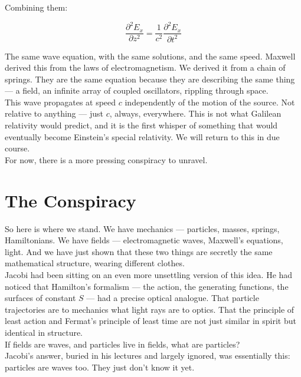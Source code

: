 \documentclass[krantz1,ChapterTOCs]{krantz}
\begin{document}
Combining them:

$$\frac{\partial^2 E_x}{\partial z^2} = \frac{1}{c^2}\frac{\partial^2 E_x}{\partial t^2}$$

The same wave equation, with the same solutions, and the same speed. Maxwell derived this from the laws of electromagnetism. We derived it from a chain of springs. They are the same equation because they are describing the same thing --- a field, an infinite array of coupled oscillators, rippling through space.\\

This wave propagates at speed $c$ independently of the motion of the source. Not relative to anything --- just $c$, always, everywhere. This is not what Galilean relativity would predict, and it is the first whisper of something that would eventually become Einstein's special relativity. We will return to this in due course.\\

For now, there is a more pressing conspiracy to unravel.\\

\section*{The Conspiracy}

So here is where we stand. We have mechanics --- particles, masses, springs, Hamiltonians. We have fields --- electromagnetic waves, Maxwell's equations, light. And we have just shown that these two things are secretly the same mathematical structure, wearing different clothes.\\

Jacobi had been sitting on an even more unsettling version of this idea. He had noticed that Hamilton's formalism --- the action, the generating functions, the surfaces of constant $S$ --- had a precise optical analogue. That particle trajectories are to mechanics what light rays are to optics. That the principle of least action and Fermat's principle of least time are not just similar in spirit but identical in structure.\\

If fields are waves, and particles live in fields, what are particles?\\

Jacobi's answer, buried in his lectures and largely ignored, was essentially this: particles are waves too. They just don't know it yet.\\
\end{document}
